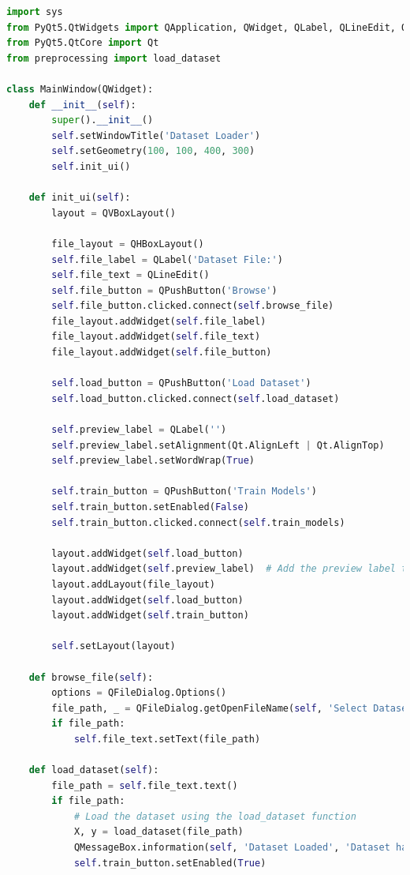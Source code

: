 \documentclass[letterpaper,10pt]{article}
\begin{document}
\begin{lstlisting}[language=Python, caption=ui.py - Initial Effort with file loading. Mostly a dummy interface.]
    import sys
from PyQt5.QtWidgets import QApplication, QWidget, QLabel, QLineEdit, QPushButton, QVBoxLayout, QHBoxLayout, QFileDialog, QMessageBox
from PyQt5.QtCore import Qt
from preprocessing import load_dataset

class MainWindow(QWidget):
    def __init__(self):
        super().__init__()
        self.setWindowTitle('Dataset Loader')
        self.setGeometry(100, 100, 400, 300)  
        self.init_ui()
    
    def init_ui(self):
        layout = QVBoxLayout()

        file_layout = QHBoxLayout()
        self.file_label = QLabel('Dataset File:')
        self.file_text = QLineEdit()
        self.file_button = QPushButton('Browse')
        self.file_button.clicked.connect(self.browse_file)
        file_layout.addWidget(self.file_label)
        file_layout.addWidget(self.file_text)
        file_layout.addWidget(self.file_button)

        self.load_button = QPushButton('Load Dataset')
        self.load_button.clicked.connect(self.load_dataset)

        self.preview_label = QLabel('')
        self.preview_label.setAlignment(Qt.AlignLeft | Qt.AlignTop)
        self.preview_label.setWordWrap(True)

        self.train_button = QPushButton('Train Models')
        self.train_button.setEnabled(False)
        self.train_button.clicked.connect(self.train_models)

        layout.addWidget(self.load_button)
        layout.addWidget(self.preview_label)  # Add the preview label to the layout
        layout.addLayout(file_layout)
        layout.addWidget(self.load_button)
        layout.addWidget(self.train_button)

        self.setLayout(layout)
    
    def browse_file(self):
        options = QFileDialog.Options()
        file_path, _ = QFileDialog.getOpenFileName(self, 'Select Dataset File', '', 'All Files (*)', options=options)
        if file_path:
            self.file_text.setText(file_path)
    
    def load_dataset(self):
        file_path = self.file_text.text()
        if file_path:
            # Load the dataset using the load_dataset function
            X, y = load_dataset(file_path)
            QMessageBox.information(self, 'Dataset Loaded', 'Dataset has been loaded successfully.')
            self.train_button.setEnabled(True)


\end{lstlisting}
\end{document}
